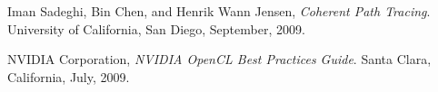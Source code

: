 \documentclass[10pt,twocolumn,a4paper]{article}
\begin{document}

\begin{thebibliography}{9}

    Iman Sadeghi, Bin Chen, and Henrik Wann Jensen,
    \emph{Coherent Path Tracing}.
    University of California, San Diego,
    September, 2009.

    NVIDIA Corporation,
    \emph{NVIDIA OpenCL Best Practices Guide}.
    Santa Clara, California,
    July, 2009.

\end{thebibliography}
\end{document}
